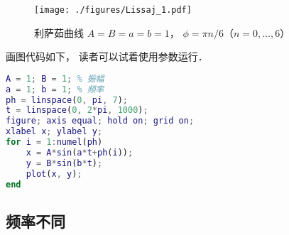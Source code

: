\begin{figure}[ht]
\centering
\texttt{[image: ./figures/Lissaj\_1.pdf]}
\caption{利萨茹曲线 $A = B = a = b = 1$， $\phi = \pi n/6$（$n = 0,\dots,6$）} \label{Lissaj_fig1}
\end{figure}

画图代码如下， 读者可以试着使用参数运行．
\begin{lstlisting}[language=matlab, caption=lissajous.m]
% 画利萨茹曲线
A = 1; B = 1; % 振幅
a = 1; b = 1; % 频率
ph = linspace(0, pi, 7);
t = linspace(0, 2*pi, 1000);
figure; axis equal; hold on; grid on;
xlabel x; ylabel y;
for i = 1:numel(ph)
    x = A*sin(a*t+ph(i));
    y = B*sin(b*t);
    plot(x, y);
end
\end{lstlisting}

\subsection{频率不同}
